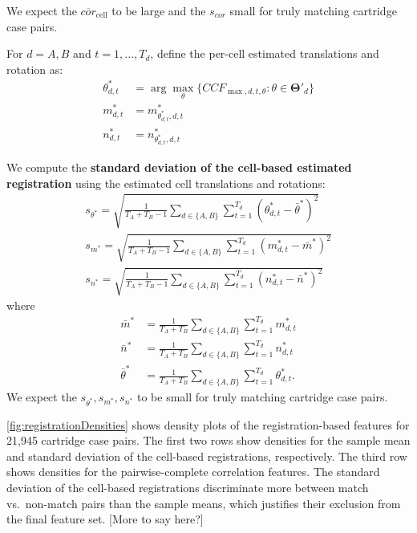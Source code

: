 \documentclass[
]{jdssv}
\begin{document}
We expect the \(\overline{cor}_{\text{cell}}\) to be large and the
\(s_{cor}\) small for truly matching cartridge case pairs.

For \(d = A,B\) and \(t = 1,...,T_d\), define the per-cell estimated
translations and rotation as: \begin{align*}
\theta^*_{d,t} &= \arg \max_{\theta} \{CCF_{\max,d,t,\theta} : \theta \in \pmb{\Theta}'_d\} \\
m^*_{d,t} &= m^*_{\theta^*_{d,t},d,t} \\
n^*_{d,t} &= n^*_{\theta^*_{d,t},d,t}
\end{align*}

We compute the
\textbf{standard deviation of the cell-based estimated registration}
using the estimated cell translations and rotations: \begin{align*}
s_{\theta^*} =  \sqrt{\frac{1}{T_A + T_B - 1} \sum_{d \in \{A,B\}} \sum_{t=1}^{T_d} (\theta^*_{d,t} - \bar{\theta}^*)^2} \\
s_{m^*} =  \sqrt{\frac{1}{T_A + T_B - 1} \sum_{d \in \{A,B\}} \sum_{t=1}^{T_d} (m^*_{d,t} - \bar{m}^*)^2} \\
s_{n^*} = \sqrt{\frac{1}{T_A + T_B - 1} \sum_{d \in \{A,B\}} \sum_{t=1}^{T_d} (n^*_{d,t} - \bar{n}^*)^2}
\end{align*} where \begin{align*}
\bar{m}^* &= \frac{1}{T_A + T_B} \sum_{d \in \{A,B\}}\sum_{t=1}^{T_d} m^*_{d,t} \\
\bar{n}^* &= \frac{1}{T_A + T_B} \sum_{d \in \{A,B\}} \sum_{t=1}^{T_d} n^*_{d,t} \\
\bar{\theta}^* &= \frac{1}{T_A + T_B} \sum_{d \in \{A,B\}} \sum_{t=1}^{T_d} \theta^*_{d,t}.
\end{align*} We expect the \(s_{\theta^*}, s_{m^*},s_{n^*}\) to be small
for truly matching cartridge case pairs.

\autoref{fig:registrationDensities} shows density plots of the
registration-based features for 21,945 cartridge case pairs. The first
two rows show densities for the sample mean and standard deviation of
the cell-based registrations, respectively. The third row shows
densities for the pairwise-complete correlation features. The standard
deviation of the cell-based registrations discriminate more between
match vs.~non-match pairs than the sample means, which justifies their
exclusion from the final feature set. {[}More to say here?{]}
\end{document}
